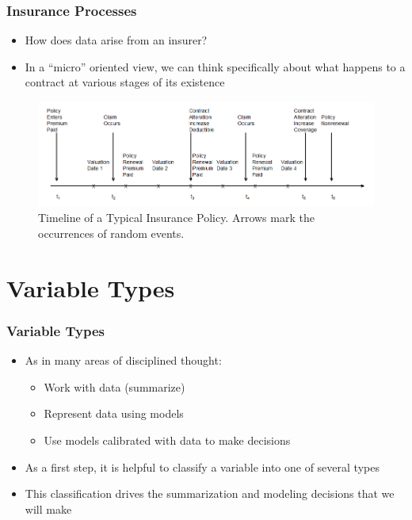 \documentclass[serif,10pt]{beamer}
\begin{document}
\begin{frame}
\frametitle{Insurance Processes}
  \begin{itemize}
\item How does data arise from an insurer?
\item In a ``micro'' oriented view, we can think specifically about what happens to a contract at various stages of its existence
\end{itemize}
\vspace{-.15in}
\begin{figure}[htp]
\begin{center}
    \includegraphics[scale = 0.5, bb = 400 220 100 100]{Figures/StochOperationsD.PNG}
    \caption{\label{F:StochOperations}\small Timeline of a Typical Insurance Policy. Arrows mark the occurrences of random events.}
\end{center}
\end{figure}
\end{frame}


\section{Variable Types}

\begin{frame}
\frametitle{Variable Types}
  \begin{itemize}
\item As in many areas of disciplined thought: \vspace{2mm}
  \begin{itemize}
\item Work with data (summarize) \vspace{2mm}
\item Represent data using models \vspace{2mm}
\item Use models calibrated with data to make decisions \vspace{2mm}
\end{itemize}
\item As a first step, it is helpful to classify a variable into one of several
types \vspace{2mm}
\item This classification drives the summarization and modeling decisions that we will
make
\end{itemize}
\end{frame}
\end{document}
